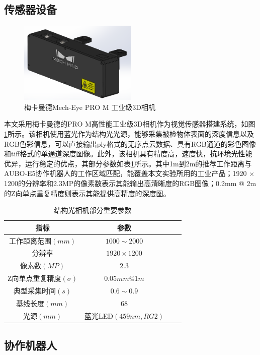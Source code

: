 \subsection{传感器设备}
\begin{figure}[htbp]
  \centering
  \includegraphics[width=0.5\textwidth]{figures/2/Mech-Eye-V3.png}
  \caption{梅卡曼德Mech-Eye PRO M 工业级3D相机}\label{fig:Mech-Eye-V3}
\end{figure}
本文采用梅卡曼德的PRO M高性能工业级3D相机作为视觉传感器搭建系统，如图\ref{fig:Mech-Eye-V3}所示。该相机使用蓝光作为结构光光源，能够采集被检物体表面的深度信息以及RGB色彩信息，可以直接输出ply格式的无序点云数据、具有RGB通道的彩色图像和tiff格式的单通道深度图像。此外，该相机具有精度高，速度快，抗环境光性能优异，运行稳定的优点，其部分参数如表\ref{tab:category}所示。其中1m到2m的推荐工作距离与AUBO-E5协作机器人的工作区域匹配，能覆盖本文实验所用的工业产品；1920 × 1200的分辨率和2.3MP的像素数表示其能输出高清晰度的RGB图像；0.2mm @ 2m的Z向单点重复精度则表示其能提供高精度的深度图。
\begin{table}[htbp]
  \centering
  \caption{结构光相机部分重要参数} \label{tab:category}
  \begin{tabular*}{0.75\textwidth}{@{\extracolsep{\fill}}cccc}
  \toprule
    指标			&参数		 \\
  \midrule
    工作距离范围$(mm)$ &  $1000\sim 2000$    \\
    分辨率			&$1920\times 1200$		 \\
    像素数$(MP)$	&$2.3$	 \\
    Z向单点重复精度$(\sigma)$	& $0.05mm @ 1m$\\
    典型采集时间$(s)$	& $0.6\sim0.9$\\
    基线长度$(mm)$ &  $68$    \\
    光源$(mm)$ &  蓝光LED$(459nm,RG2)$    \\
  \bottomrule
  \end{tabular*}
\end{table}


\subsection{协作机器人}

